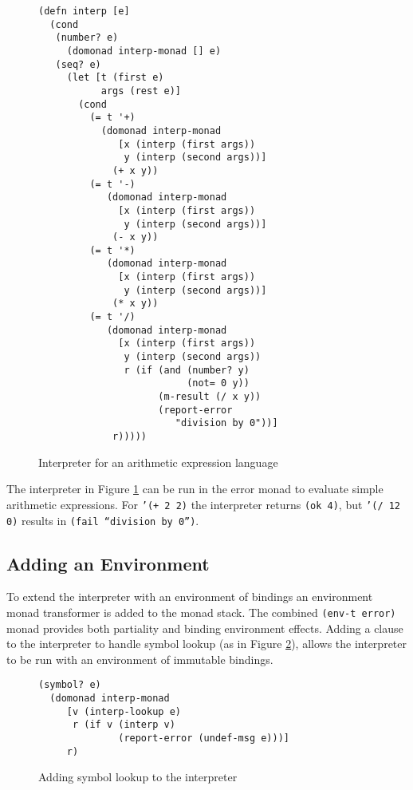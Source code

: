 \documentclass[natbib,10pt]{sigplanconf}
\begin{document}
\begin{figure}
\begin{center}
\begin{verbatim}
(defn interp [e]
  (cond
   (number? e) 
     (domonad interp-monad [] e)
   (seq? e)    
     (let [t (first e)
           args (rest e)]
       (cond
         (= t '+) 
           (domonad interp-monad
              [x (interp (first args))
               y (interp (second args))]
             (+ x y))
         (= t '-) 
            (domonad interp-monad
              [x (interp (first args))
               y (interp (second args))]
             (- x y))
         (= t '*) 
            (domonad interp-monad
              [x (interp (first args))
               y (interp (second args))]
             (* x y))
         (= t '/) 
            (domonad interp-monad
              [x (interp (first args))
               y (interp (second args))
               r (if (and (number? y) 
                          (not= 0 y))
                     (m-result (/ x y))
                     (report-error 
                        "division by 0"))]
             r)))))
\end{verbatim}
\end{center}
\caption{Interpreter for an arithmetic expression language}
\label{fig-interp-0}
\end{figure}

The interpreter in Figure \ref{fig-interp-0} can be run in the error
monad to evaluate simple arithmetic expressions.  For {\tt '(+ 2 2)}
the interpreter returns {\tt (ok 4)}, but {\tt '(/ 12 0)} results in
{\tt (fail ``division by 0'')}.

\subsection{Adding an Environment}

To extend the interpreter with an environment of bindings an
environment monad transformer is added to the monad stack.  The
combined {\tt (env-t error)} monad provides both partiality and
binding environment effects. Adding a clause to the interpreter
to handle symbol lookup (as in Figure \ref{fig-interp-1}), 
allows the interpreter to be run with an environment of immutable 
bindings. 

\begin{figure}
\begin{center} 
\begin{verbatim}
(symbol? e)
  (domonad interp-monad
     [v (interp-lookup e)
      r (if v (interp v)
              (report-error (undef-msg e)))]
     r)
\end{verbatim}
\end{center}
\caption{Adding symbol lookup to the interpreter}
\label{fig-interp-1}
\end{figure}
\end{document}
